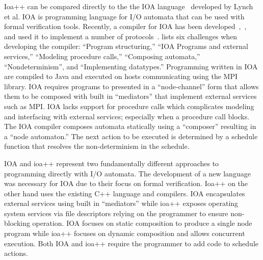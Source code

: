 Ioa++ can be compared directly to the the IOA language~\cite{garland2003ioa} developed by Lynch et al.
IOA is programming language for I/O automata that can be used with formal verification tools.
Recently, a compiler for IOA has been developed~\cite{tsai2002code},~\cite{tauber2004verifiable},~\cite{tauber2004compiling} and used it to implement a number of protocols~\cite{georgiou2009automated}.
\cite{georgiou2009automated} lists six challenges when developing the compiler: ``Program structuring,'' ``IOA Programs and external services,'' ``Modeling procedure calls,'' ``Composing automata,'' ``Nondeterminism'', and ``Implementing datatypes.''
Programming written in IOA are compiled to Java and executed on hosts communicating using the MPI library.
IOA requires programs to presented in a ``node-channel'' form that allows them to be composed with built in ``mediators'' that implement external services such as MPI.
IOA lacks support for procedure calls which complicates modeling and interfacing with external services; especially when a procedure call blocks.
The IOA compiler composes automata statically using a ``composer'' resulting in a ``node automaton.''
The next action to be executed is determined by a schedule function that resolves the non-determinism in the schedule.

IOA and ioa++ represent two fundamentally different approaches to programming directly with I/O automata.
The development of a new language was necessary for IOA due to their focus on formal verification.
Ioa++ on the other hand uses the existing C++ language and compilers.
IOA encapsulates external services using built in ``mediators'' while ioa++ exposes operating system services via file descriptors relying on the programmer to ensure non-blocking operation.
IOA focuses on static composition to produce a single node program while ioa++ focuses on dynamic composition and allows concurrent execution.
Both IOA and ioa++ require the programmer to add code to schedule actions.










